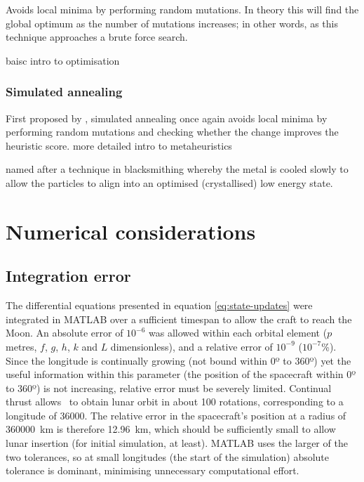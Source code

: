 Avoids local minima by performing random mutations. In theory this will find the global optimum as the number of mutations increases; in other words, as this technique approaches a brute force search.

\textcite{Nocedal2006} baisc intro to optimisation

\subsubsection{Simulated annealing}

First proposed by \textcite{Kirkpatrick1983}, simulated annealing once again avoids local minima by performing random mutations and checking whether the change improves the heuristic score.
\textcite{Dreo2006} more detailed intro to metaheuristics

named after a technique in blacksmithing whereby the metal is cooled slowly to allow the particles to align into an optimised (crystallised) low energy state.



\section{Numerical considerations} \label{sec:Numerical-considerations}


\subsection{Integration error} \label{sub:Integration-error}

The differential equations presented in equation \eqref{eq:state-updates} were integrated in MATLAB over a sufficient timespan to allow the craft to reach the Moon. An absolute error of $10^{-6}$ was allowed within each orbital element ($p$ metres, $f$, $g$, $h$, $k$ and $L$ dimensionless), and a relative error of $10^{-9}$ ($10^{-7}$\%). Since the longitude is continually growing (not bound within 0º to 360º) yet the useful information within this parameter (the position of the spacecraft within 0º to 360º) is not increasing, relative error must be severely limited. Continual thrust allows \BW\ to obtain lunar orbit in about 100 rotations, corresponding to a longitude of 36000\degrees. The relative error in the spacecraft's position at a radius of 360000~km is therefore 12.96~km, which should be sufficiently small to allow lunar insertion (for initial simulation, at least). MATLAB uses the larger of the two tolerances, so at small longitudes (the start of the simulation) absolute tolerance is dominant, minimising unnecessary computational effort.

